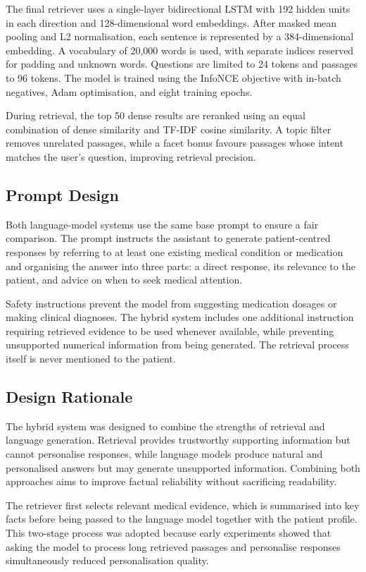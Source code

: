 The final retriever uses a single-layer bidirectional LSTM with 192 hidden units in each direction and 128-dimensional word embeddings. After masked mean pooling and L2 normalisation, each sentence is represented by a 384-dimensional embedding. A vocabulary of 20,000 words is used, with separate indices reserved for padding and unknown words. Questions are limited to 24 tokens and passages to 96 tokens. The model is trained using the InfoNCE objective with in-batch negatives, Adam optimisation, and eight training epochs.

During retrieval, the top 50 dense results are reranked using an equal combination of dense similarity and TF-IDF cosine similarity. A topic filter removes unrelated passages, while a facet bonus favours passages whose intent matches the user's question, improving retrieval precision.

\subsection{Prompt Design}

Both language-model systems use the same base prompt to ensure a fair comparison. The prompt instructs the assistant to generate patient-centred responses by referring to at least one existing medical condition or medication and organising the answer into three parts: a direct response, its relevance to the patient, and advice on when to seek medical attention.

Safety instructions prevent the model from suggesting medication dosages or making clinical diagnoses. The hybrid system includes one additional instruction requiring retrieved evidence to be used whenever available, while preventing unsupported numerical information from being generated. The retrieval process itself is never mentioned to the patient.

\subsection{Design Rationale}

The hybrid system was designed to combine the strengths of retrieval and language generation. Retrieval provides trustworthy supporting information but cannot personalise responses, while language models produce natural and personalised answers but may generate unsupported information. Combining both approaches aims to improve factual reliability without sacrificing readability.

The retriever first selects relevant medical evidence, which is summarised into key facts before being passed to the language model together with the patient profile. This two-stage process was adopted because early experiments showed that asking the model to process long retrieved passages and personalise responses simultaneously reduced personalisation quality.

